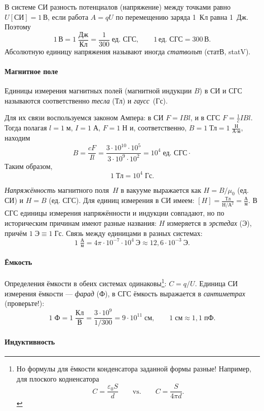 В системе СИ разность потенциалов (напряжение)
между точками равно $U[\text{СИ}]=1\,\text{В}$,
если работа $A=qU$ по перемещению заряда 1~Кл равна 1~Дж. Поэтому
\[
1\,\text{В}=1\;\frac{\text{Дж}}{\text{Кл}}=\frac{1}{300}\;\text{ед. СГС},\qquad1\,\text{ед. СГС}=300\,\text{В}.
\]
Абсолютную единицу напряжения называют иногда \emph{статвольт} (статВ, statV).


\paragraph{Магнитное поле}

Единицы измерения магнитных полей (магнитной индукции $B$) в СИ и СГС называются соответственно
\emph{тесла} (Тл) и \emph{гаусс}~(Гс).

Для их связи воспользуемся
законом Ампера: в СИ $F=IBl$, и в СГС $F=\frac{1}{c}IBl$. Тогда
полагая $l=1\;\text{м}$, $I=1\;\text{А}$, $F=1\;\text{Н}$ и, соответственно,
$B=1\;\text{Тл}=1\;\frac{\text{Н}}{\text{А}\cdot\text{м}}$, находим
\[
B=\frac{cF}{Il}=\frac{3\cdot10^{10}\cdot10^{5}}{3\cdot10^{9}\cdot10^{2}}=10^{4}\;\text{ед. СГС}\cdot
\]
Таким образом,
\[
1\;\text{Тл}=10^{4}\;\text{Гс}.
\]

\emph{Напряжённость} магнитного поля~$H$ в вакууме выражается как $H=B/\mu_0$ 
(ед. СИ) и $H=B$ (ед. СГС). Для единиц измерения в СИ имеем: 
$[H] = \frac{Тл}{Н/А^2}=\frac{А}{м}$. В СГС единицы измерения напряжённости
и индукции совпадают, но по историческим причинам имеют разные названия:
$H$ измеряется в \emph{эрстедах} (Э), причём $1\;\text{Э} \equiv 1\;\text{Гс}$.
Связь между единицами в разных системах:
\[
1\;\tfrac{А}{м} = 4\pi \cdot 10^{-7}\cdot 10^4~Э \approx 12,6\cdot 10^{-3}~Э.
\]


\paragraph{Ёмкость}

Определения ёмкости в обеих системах одинаковы\footnote{Но формулы для
ёмкости конденсатора заданной формы разные! Например, для плоского
кодненсатора
\[
C=\frac{\varepsilon_{0}S}{d}\qquad\mathrm{vs.}\qquad C=\frac{S}{4\pi d}.
\]
}: $C=q/U$. Единица СИ измерения ёмкости --- \emph{фарад} (Ф), в
СГС ёмкость выражается в \emph{сантиметрах} (проверьте!):
\[
1\;\text{Ф}=1\;\frac{\text{Кл}}{\text{В}}=\frac{3\cdot10^{9}}{1/300}=9\cdot10^{11}\;\text{см},\qquad1\;\text{см}\approx1{,}1\;\text{пФ}.
\]


\paragraph{Индуктивность}

